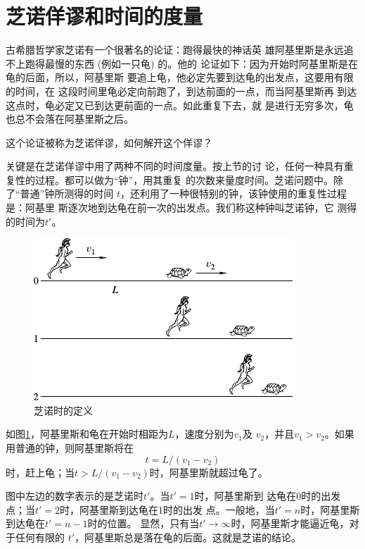 \section{芝诺佯谬和时间的度量}\label{sec:01.02}

古希腊哲学家芝诺有一个很著名的论证：跑得最快的神话英
雄阿基里斯是永远追不上跑得最慢的东西 (例如一只龟) 的。他的
论证如下：因为开始时阿基里斯是在龟的后面，所以，阿基里斯
要追上龟，他必定先要到达龟的出发点，这要用有限的时间，在
这段时间里龟必定向前跑了，到达前面的一点，而当阿基里斯再
到达这点时，龟必定又已到达更前面的一点。如此重复下去，就
是进行无穷多次，龟也总不会落在阿基里斯之后。

这个论证被称为芝诺佯谬，如何解开这个佯谬？

关键是在芝诺佯谬中用了两种不同的时间度量。按上节的讨
论，任何一种具有重复性的过程。都可以做为“钟”，用其重复
的次数来量度时间。芝诺问题中。除了“普通”钟所测得的时间
$t$，还利用了一种很特别的钟，该钟使用的重复性过程是：阿基里
斯逐次地到达龟在前一次的出发点。我们称这种钟叫芝诺钟，它
测得的时间为$t'$。

\begin{figure}[!h]
  \centering
  \includegraphics{figure/fig01.02}
  \caption{芝诺时的定义}\label{fig:01.02}
\end{figure}

如图\ref{fig:01.02}，阿基里斯和龟在开始时相距为$L$，速度分别为$v_1$及
$v_2$，并且$v_1>v_2$。如果用普通的钟，则阿基里斯将在
\begin{equation}
  t=L/\left(v_1-v_2\right)
  \label{eqn:01.02.01}
\end{equation}
时，赶上龟；当$t>L/\left(v_1-v_2\right)$时，阿基里斯就超过龟了。

图中左边的数字表示的是芝诺时$t'$。当$t'=1$时，阿基里斯到
达龟在0时的出发点；当$t'=2$时，阿基里斯到达龟在1时的出发
点。一般地，当$t'=n$时，阿基里斯到达龟在$t'=n-1$时的位置。
显然，只有当$t'\to\infty$时，阿基里斯才能逼近龟，对于任何有限的
$t'$，阿基里斯总是落在龟的后面。这就是芝诺的结论。

